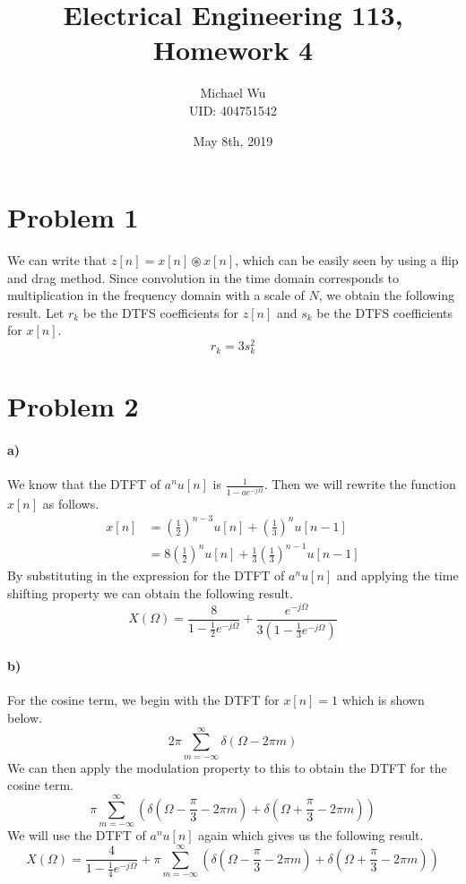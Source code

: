 \documentclass[12pt]{article}
\begin{document}
\title{Electrical Engineering 113, Homework 4}
\date{May 8th, 2019}
\author{Michael Wu\\UID: 404751542}
\maketitle


\section*{Problem 1}

We can write that \(z[n]=x[n]\circledast x[n]\), which can be easily seen by using a flip and drag method. Since
convolution in the time domain corresponds to multiplication in the frequency domain with a scale of \(N\), we obtain
the following result. Let \(r_k\) be the DTFS coefficients for \(z[n]\) and \(s_k\) be the DTFS coefficients for \(x[n]\).
\[r_k = 3s_k^2\]

\section*{Problem 2}

\paragraph{a)}

We know that the DTFT of \(a^nu[n]\) is \(\frac{1}{1-ae^{-j\Omega}}\). Then we will rewrite the function \(x[n]\) as follows.
\begin{align*}
    x[n] &= \left(\frac{1}{2}\right)^{n-3} u[n] + \left(\frac{1}{3}\right)^n u[n-1]\\
    &=8\left(\frac{1}{2}\right)^n u[n] + \frac{1}{3}\left(\frac{1}{3}\right)^{n-1} u[n-1]
\end{align*}
By substituting in the expression for the DTFT of \(a^nu[n]\) and applying the time shifting property we can obtain the following result.
\[X(\Omega)= \frac{8}{1-\frac{1}{2}e^{-j\Omega}} + \frac{e^{-j\Omega}}{3\left(1-\frac{1}{3}e^{-j\Omega}\right)}\]

\paragraph{b)}

For the cosine term, we begin with the DTFT for \(x[n]=1\) which is shown below.
\[2\pi \sum_{m=-\infty}^\infty \delta(\Omega-2\pi m)\]
We can then apply the modulation property to this to obtain the DTFT for the cosine term.
\[\pi\sum_{m=-\infty}^\infty\left(\delta\left(\Omega-\frac{\pi}{3}-2\pi m\right) + \delta\left(\Omega+\frac{\pi}{3}-2\pi m\right)\right)\]
We will use the DTFT of \(a^nu[n]\) again which gives us the following result.
\[X(\Omega) = \frac{4}{1-\frac{1}{4}e^{-j\Omega}}+\pi\sum_{m=-\infty}^\infty\left(\delta\left(\Omega-\frac{\pi}{3}-2\pi m\right)
+\delta\left(\Omega+\frac{\pi}{3}-2\pi m\right)\right)\]
\end{document}
